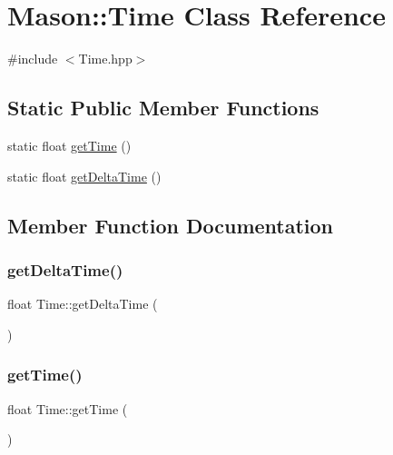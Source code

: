 \hypertarget{class_mason_1_1_time}{}\section{Mason\+:\+:Time Class Reference}
\label{class_mason_1_1_time}


{\ttfamily \#include $<$Time.\+hpp$>$}

\subsection*{Static Public Member Functions}
\begin{DoxyCompactItemize}
\item 
static float \hyperlink{class_mason_1_1_time_ad6773c7a2339b463fc7ea14e31315c89}{get\+Time} ()
\item 
static float \hyperlink{class_mason_1_1_time_a405c7642c4ba0ee719a8d0491099102a}{get\+Delta\+Time} ()
\end{DoxyCompactItemize}


\subsection{Member Function Documentation}
\hypertarget{class_mason_1_1_time_a405c7642c4ba0ee719a8d0491099102a}{}\label{class_mason_1_1_time_a405c7642c4ba0ee719a8d0491099102a} 
\subsubsection{\texorpdfstring{get\+Delta\+Time()}{getDeltaTime()}}
{\footnotesize\ttfamily float Time\+::get\+Delta\+Time (\begin{DoxyParamCaption}{ }\end{DoxyParamCaption})\hspace{0.3cm}{\ttfamily [static]}}

\hypertarget{class_mason_1_1_time_ad6773c7a2339b463fc7ea14e31315c89}{}\label{class_mason_1_1_time_ad6773c7a2339b463fc7ea14e31315c89} 
\subsubsection{\texorpdfstring{get\+Time()}{getTime()}}
{\footnotesize\ttfamily float Time\+::get\+Time (\begin{DoxyParamCaption}{ }\end{DoxyParamCaption})\hspace{0.3cm}{\ttfamily [static]}}




